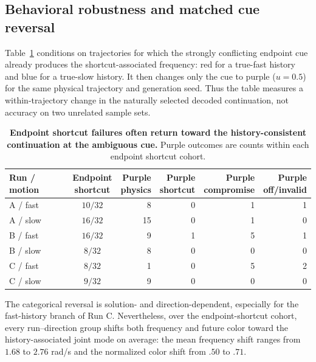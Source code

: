 \subsection{Behavioral robustness and matched cue reversal}
\label{app:endpoint-purple}
\label{app:multiseed-behavior}

Table~\ref{tab:endpoint-purple} conditions on trajectories for which the strongly
conflicting endpoint cue already produces the shortcut-associated frequency: red for
a true-fast history and blue for a true-slow history. It then changes only the cue to
purple ($u=0.5$) for the same physical trajectory and generation seed. Thus the table
measures a within-trajectory change in the naturally selected decoded continuation,
not accuracy on two unrelated sample sets.

\begin{table}[!htbp]
  \centering
  \caption{\textbf{Endpoint shortcut failures often return toward the
  history-consistent continuation at the ambiguous cue.} Purple outcomes are
  counts within each endpoint shortcut cohort.}
  \label{tab:endpoint-purple}
  \setlength{\tabcolsep}{3pt}
  \begin{tabular}{lcrrrr}
    \toprule
    Run / motion & \shortstack{Endpoint\\shortcut} & \shortstack{Purple\\physics} & \shortstack{Purple\\shortcut} & \shortstack{Purple\\compromise} & \shortstack{Purple\\off/invalid} \\
    \midrule
    A / fast & $10/32$ & 8 & 0 & 1 & 1 \\
    A / slow & $16/32$ & 15 & 0 & 1 & 0 \\
    B / fast & $16/32$ & 9 & 1 & 5 & 1 \\
    B / slow & $8/32$ & 8 & 0 & 0 & 0 \\
    C / fast & $8/32$ & 1 & 0 & 5 & 2 \\
    C / slow & $9/32$ & 9 & 0 & 0 & 0 \\
    \bottomrule
  \end{tabular}
\end{table}

The categorical reversal is solution- and direction-dependent, especially for
the fast-history branch of Run C. Nevertheless, over the endpoint-shortcut
cohort, every run--direction group shifts both frequency and future color toward
the history-associated joint mode on average: the mean frequency shift ranges
from $1.68$ to $2.76$ rad/s and the normalized color shift from $.50$ to $.71$.

